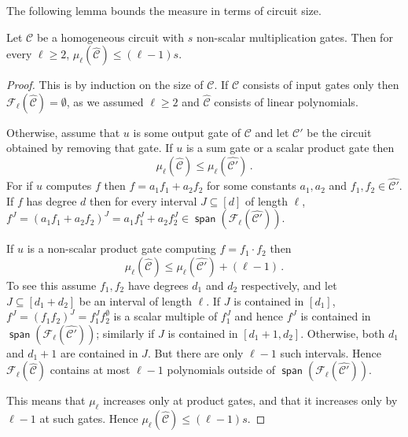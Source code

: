 \documentclass[11pt]{article}
\newcommand{\an}[1]{\textcolor{red}{#1}}
\newcommand{\ckt}{\textbf{$\mathcal{C}$}}
\newcommand{\spn}{\operatorname{\mathsf{span}}}
\renewcommand{\fam}{\textbf{$\mathcal{F}$}}
\begin{document}
The following lemma bounds the measure in terms of circuit size. 



\begin{lemma}\label{lem:meausure_ub_hom_nc_ckt}\label{lem:mu}
  Let $\ckt$ be a homogeneous circuit with $s$ non-scalar multiplication gates. Then for every $\ell\geq 2$, $\mu_\ell(\widehat {\ckt})\leq (\ell-1)s$. 
\end{lemma}

\begin{proof} 
  This is by induction on the size of $\ckt$. 
  If $\ckt$ consists of input gates only then $\fam_\ell(\widehat {\ckt})=\emptyset$, as we assumed $\ell\geq 2$ and $\widehat {\ckt}$ consists of linear polynomials. 

  Otherwise, assume that $u$ is some output gate of $\ckt$ and let $\ckt'$ be the circuit obtained by removing that gate. 
  If $u$ is a sum gate or a scalar product gate then 
  \[
    \mu_\ell(\widehat {\ckt})\leq  \mu_\ell(\widehat {\ckt'})\,.
  \]
  For if $u$ computes $f$  then $f=a_1f_1+a_2f_2$ for some constants $a_1, a_2$ and $f_1,f_2\in \widehat {\ckt'}$. 
  If $f$ has  degree $d$ then for every interval  $J\subseteq [d]$ of length $\ell$, $f^J=(a_1f_1+a_2f_2)^J= a_1f_1^J+a_2f_2^J\in \spn(\fam_\ell(\widehat{\ckt'}))$. 

  If $u$ is a non-scalar product gate computing $f=f_1\cdot f_2$ then 
  \[
    \mu_\ell(\widehat {\ckt})\leq \mu_\ell(\widehat {\ckt'})+ (\ell-1)\,.
  \]
  To see this assume $f_1,f_2$ have degrees $d_1$ and $d_2$ respectively, and let $J\subseteq [d_1+d_2]$ be an interval of length $\ell$. 
  If $J$ is contained in $[d_1]$, $f^J= (f_1f_2)^J= f_1^J f_2^\emptyset$ is a scalar multiple of $f_1^J$ and hence $f^J$ is contained in $\spn(\fam_\ell(\widehat {\ckt'}))$; similarly if $J$ is contained in $[d_1+1,d_2]$. 
  Otherwise, both $d_1$ and $d_1+1$ are contained in $J$. 
  But there are only $\ell-1$ such intervals.  
  Hence $\fam_\ell(\widehat {\ckt})$ contains at most $\ell-1$ polynomials outside of $\spn(\fam_\ell(\widehat {\ckt'}))$. 
 
  This means that $\mu_\ell$ increases only at product gates, and that it increases only by $\ell-1$ at such gates.
  Hence $\mu_\ell(\widehat {\ckt})\leq (\ell-1)s$.
\end{proof}
\end{document}

